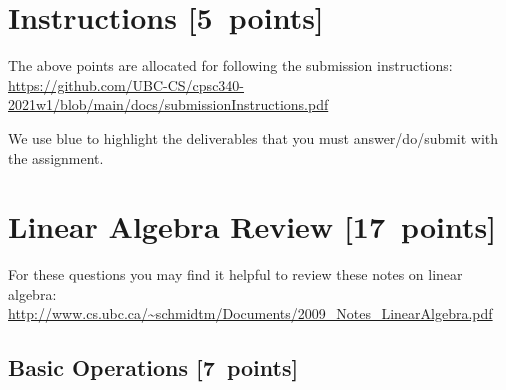 \documentclass{article}
\newcommand{\blu}[1]{{\textcolor{blu}{#1}}}
\let\ask\blu
\newcommand\pts[1]{\textcolor{pointscolour}{[#1~points]}}
\begin{document}
  \section*{Instructions \pts{5}}

  The above points are allocated for following the submission instructions: \\\url{https://github.com/UBC-CS/cpsc340-2021w1/blob/main/docs/submissionInstructions.pdf}

  \vspace{1em}
  We use \ask{blue} to highlight the deliverables that you must answer/do/submit with the assignment.

  \section{Linear Algebra Review \pts{17}}

  For these questions you may find it helpful to review these notes on linear algebra:\\
  \url{http://www.cs.ubc.ca/~schmidtm/Documents/2009_Notes_LinearAlgebra.pdf}

  \subsection{Basic Operations \pts{7}}
\end{document}
